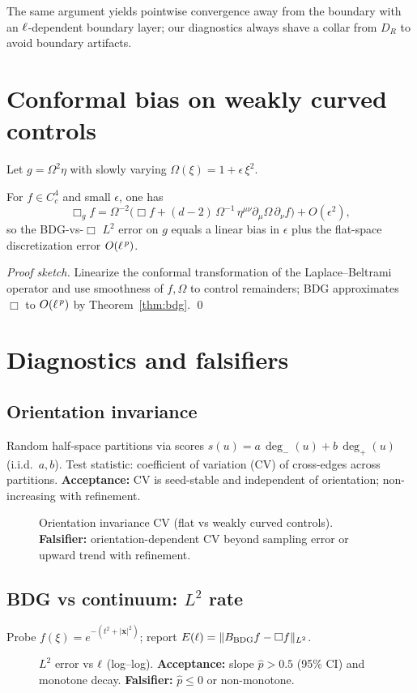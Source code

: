 \begin{remark}
The same argument yields pointwise convergence away from the boundary with an $\ell$-dependent boundary layer; our diagnostics always shave a collar from $D_R$ to avoid boundary artifacts.
\end{remark}

\section{Conformal bias on weakly curved controls}

Let $g=\Omega^2\eta$ with slowly varying $\Omega(\xi)=1+\epsilon\,\xi^2$.
\begin{lemma}\label{lem:conf}
For $f\in C_c^4$ and small $\epsilon$, one has
\[
\Box_g f = \Omega^{-2}\Big(\Box f + (d-2)\,\Omega^{-1}\,\eta^{\mu\nu}\partial_\mu\Omega\,\partial_\nu f \Big) + O(\epsilon^2),
\]
so the BDG-vs-$\Box$ $L^2$ error on $g$ equals a linear bias in $\epsilon$ plus the flat-space discretization error $O(\ell^{\,p})$.
\end{lemma}

\noindent\emph{Proof sketch.}
Linearize the conformal transformation of the Laplace–Beltrami operator and use smoothness of $f,\Omega$ to control remainders; BDG approximates $\Box$ to $O(\ell^{\,p})$ by Theorem~\ref{thm:bdg}. \qed

\section{Diagnostics and falsifiers}

\subsection{Orientation invariance}
Random half-space partitions via scores $s(u)=a\,\deg_-(u)+b\,\deg_+(u)$ (i.i.d.\ $a,b$). Test statistic: coefficient of variation (CV) of cross-edges across partitions. \textbf{Acceptance:} CV is seed-stable and independent of orientation; non-increasing with refinement.

\begin{figure}[H]\centering
{}
\caption{Orientation invariance CV (flat vs weakly curved controls). \textbf{Falsifier:} orientation-dependent CV beyond sampling error or upward trend with refinement.}
\end{figure}

\subsection{BDG vs continuum: $L^2$ rate}
Probe $f(\xi)=e^{-(t^2+|\mathbf{x}|^2)}$; report $E(\ell)=\|B_{\rm BDG}f-\Box f\|_{L^2}$.
\begin{figure}[H]\centering
{}
\caption{$L^2$ error vs $\ell$ (log–log). \textbf{Acceptance:} slope $\hat p>0.5$ (95\% CI) and monotone decay. \textbf{Falsifier:} $\hat p\le 0$ or non-monotone.}
\end{figure}

